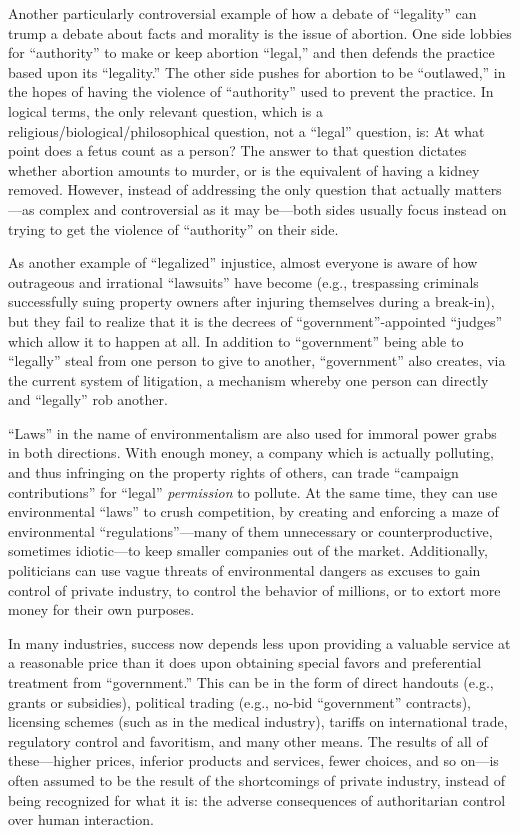\documentclass{book}
\begin{document}
Another particularly controversial example of how a debate of \enquote{legality} can trump a debate about facts and morality is the issue of abortion. One side lobbies for \enquote{authority} to make or keep abortion \enquote{legal,} and then defends the practice based upon its \enquote{legality.} The other side pushes for abortion to be \enquote{outlawed,} in the hopes of having the violence of \enquote{authority} used to prevent the practice. In logical terms, the only relevant question, which is a religious/biological/philosophical question, not a \enquote{legal} question, is: At what point does a fetus count as a person? The answer to that question dictates whether abortion amounts to murder, or is the equivalent of having a kidney removed. However, instead of addressing the only question that actually matters---as complex and controversial as it may be---both sides usually focus instead on trying to get the violence of \enquote{authority} on their side.

As another example of \enquote{legalized} injustice, almost everyone is aware of how outrageous and irrational \enquote{lawsuits} have become (e.g., trespassing criminals successfully suing property owners after injuring themselves during a break-in), but they fail to realize that it is the decrees of \enquote{government}-appointed \enquote{judges} which allow it to happen at all. In addition to \enquote{government} being able to \enquote{legally} steal from one person to give to another, \enquote{government} also creates, via the current system of litigation, a mechanism whereby one person can directly and \enquote{legally} rob another.

\enquote{Laws} in the name of environmentalism are also used for immoral power grabs in both directions. With enough money, a company which is actually polluting, and thus infringing on the property rights of others, can trade \enquote{campaign contributions} for \enquote{legal} \emph{permission} to pollute. At the same time, they can use environmental \enquote{laws} to crush competition, by creating and enforcing a maze of environmental \enquote{regulations}---many of them unnecessary or counterproductive, sometimes idiotic---to keep smaller companies out of the market. Additionally, politicians can use vague threats of environmental dangers as excuses to gain control of private industry, to control the behavior of millions, or to extort more money for their own purposes.

In many industries, success now depends less upon providing a valuable service at a reasonable price than it does upon obtaining special favors and preferential treatment from \enquote{government.} This can be in the form of direct handouts (e.g., grants or subsidies), political trading (e.g., no-bid \enquote{government} contracts), licensing schemes (such as in the medical industry), tariffs on international trade, regulatory control and favoritism, and many other means. The results of all of these---higher prices, inferior products and services, fewer choices, and so on---is often assumed to be the result of the shortcomings of private industry, instead of being recognized for what it is: the adverse consequences of authoritarian control over human interaction.
\end{document}
